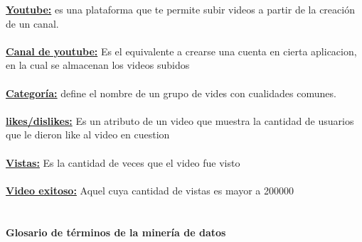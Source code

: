            \underline{\textbf{Youtube:}} es una plataforma que te permite subir videos a
            partir de la creación de un canal.\\\\
            \underline{\textbf{Canal de youtube:}} Es el equivalente a crearse una
            cuenta en cierta aplicacion, en la cual se almacenan los videos subidos\\\\
            \underline{\textbf{Categoría:}} define el nombre de un grupo de vides con
            cualidades comunes.\\\\
            \underline{\textbf{likes/dislikes:}} Es un atributo de un video que muestra la
            cantidad de usuarios que le dieron like al video en cuestion\\\\
            \underline{\textbf{Vistas:}} Es la cantidad de veces que el video fue
            visto\\\\
            \underline{\textbf{Video exitoso:}} Aquel cuya cantidad de vistas
            es mayor a 200000 \\\\

        \paragraph{Glosario de términos de la minería de datos}

